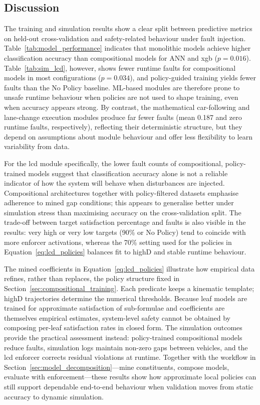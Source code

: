 \subsection{Discussion}
\label{sec:av_results_discussion}

The training and simulation results show a clear split between predictive metrics on held-out cross-validation and safety-related behaviour under fault injection. Table~\ref{tab:model_performance} indicates that monolithic models achieve higher classification accuracy than compositional models for ANN and \gls{xgb} ($p = 0.016$). Table~\ref{tab:sim_lcd}, however, shows fewer runtime faults for compositional models in most configurations ($p = 0.034$), and policy-guided training yields fewer faults than the No Policy baseline. ML-based modules are therefore prone to unsafe runtime behaviour when policies are not used to shape training, even when accuracy appears strong. By contrast, the mathematical car-following and lane-change execution modules produce far fewer faults (mean 0.187 and zero runtime faults, respectively), reflecting their deterministic structure, but they depend on assumptions about module behaviour and offer less flexibility to learn variability from data.

For the \gls{lcd} module specifically, the lower fault counts of compositional, policy-trained models suggest that classification accuracy alone is not a reliable indicator of how the system will behave when disturbances are injected. Compositional architectures together with policy-filtered datasets emphasise adherence to mined gap conditions; this appears to generalise better under simulation stress than maximising accuracy on the cross-validation split. The trade-off between target satisfaction percentage and faults is also visible in the results: very high or very low targets (90\% or No Policy) tend to coincide with more enforcer activations, whereas the 70\% setting used for the policies in Equation~\ref{eq:lcd_policies} balances fit to highD and stable runtime behaviour.

The mined coefficients in Equation~\ref{eq:lcd_policies} illustrate how empirical data refines, rather than replaces, the policy structure fixed in Section~\ref{sec:compositional_training}. Each predicate keeps a kinematic template; highD trajectories determine the numerical thresholds. Because leaf models are trained for approximate satisfaction of sub-formulae and coefficients are themselves empirical estimates, system-level safety cannot be obtained by composing per-leaf satisfaction rates in closed form. The simulation outcomes provide the practical assessment instead: policy-trained compositional models reduce faults, simulation logs maintain non-zero gaps between vehicles, and the \gls{lcd} enforcer corrects residual violations at runtime. Together with the workflow in Section~\ref{sec:model_decomposition}---mine constituents, compose models, evaluate with enforcement---these results show how approximate local policies can still support dependable end-to-end behaviour when validation moves from static accuracy to dynamic simulation.

